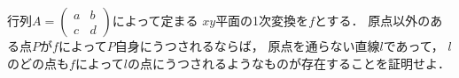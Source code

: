 \documentclass[../../main.tex]{subfiles}
\begin{document}
行列$A=
\begin{pmatrix} a & b \\ c & d
\end{pmatrix}$によって定まる
$xy$平面の1次変換を$f$とする．
原点以外のある点$P$が$f$によって$P$自身にうつされるならば，
原点を通らない直線$l$であって，
$l$のどの点も$f$によって$l$の点にうつされるようなものが存在することを証明せよ．
\end{document}

